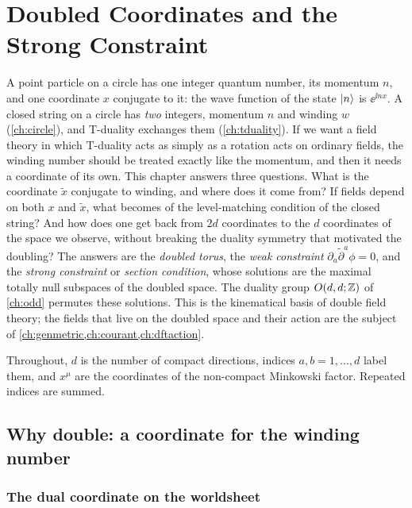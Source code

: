 \chapter{Doubled Coordinates and the Strong Constraint}\label{ch:doubled}

A point particle on a circle has one integer quantum number, its momentum $n$, and one
coordinate $x$ conjugate to it: the wave function of the state $|n\rangle$ is $\ee^{\ii nx}$. A
closed string on a circle has \emph{two} integers, momentum $n$ and winding $w$
(\cref{ch:circle}), and T-duality exchanges them (\cref{ch:tduality}). If we want a field theory
in which T-duality acts as simply as a rotation acts on ordinary fields, the winding number
should be treated exactly like the momentum, and then it needs a coordinate of its own. This
chapter answers three questions. What is the coordinate $\tilde x$ conjugate to winding, and
where does it come from? If fields depend on both $x$ and $\tilde x$, what becomes of the
level-matching condition of the closed string? And how does one get back from $2d$ coordinates
to the $d$ coordinates of the space we observe, without breaking the duality symmetry that
motivated the doubling? The answers are the \emph{doubled torus}, the \emph{weak constraint}
$\partial_a\tilde\partial^a\phi=0$, and the \emph{strong constraint} or \emph{section condition},
whose solutions are the maximal totally null subspaces of the doubled space. The duality group
$O(d,d;\mathbb{Z})$ of \cref{ch:odd} permutes these solutions. This is the kinematical basis of double
field theory; the fields that live on the doubled space and their action are the subject of
\cref{ch:genmetric,ch:courant,ch:dftaction}.

Throughout, $d$ is the number of compact directions, indices $a,b=1,\dots,d$ label them, and
$x^\mu$ are the coordinates of the non-compact Minkowski factor. Repeated indices are summed.

\section{Why double: a coordinate for the winding number}\label{sec:doubled:why}

\subsection{The dual coordinate on the worldsheet}

